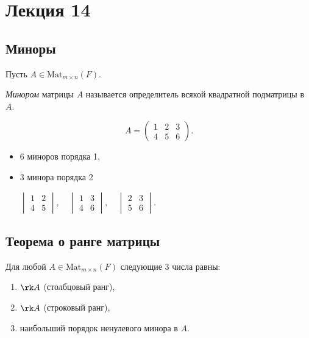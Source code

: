 \section{Лекция 14}

\subsection{Миноры}

Пусть $A \in \text{Mat}_{m \times n}(F)$.

\begin{definition}
    \textit{Минором} матрицы $A$ называется определитель всякой квадратной подматрицы в $A$.
\end{definition}

\begin{example}
    \begin{equation*}
        A = \begin{pmatrix} 1 & 2 & 3 \\ 4 & 5 & 6 \end{pmatrix}
    .\end{equation*}

    \begin{itemize}
    \item 6 миноров порядка 1,
    \item 3 минора порядка 2

        \begin{math}
            \begin{vmatrix} 1 & 2 \\ 4 & 5 \end{vmatrix}, \quad
            \begin{vmatrix} 1 & 3 \\ 4 & 6 \end{vmatrix}, \quad
            \begin{vmatrix} 2 & 3 \\ 5 & 6 \end{vmatrix}
        .\end{math}
    \end{itemize}
\end{example}


\subsection{Теорема о ранге матрицы}

\begin{theorem}
    Для любой $A \in \text{Mat}_{m \times n}(F)$ следующие 3 числа равны:
    \begin{enumerate}[label=(\arabic*),nosep]
    \item \label{lec14:eq_thm:1} $\rk A$ (столбцовый ранг),
    \item \label{lec14:eq_thm:2} $\rk A$ (строковый ранг),
    \item \label{lec14:eq_thm:3} наибольший порядок ненулевого минора в $A$.
    \end{enumerate}
\end{theorem}

